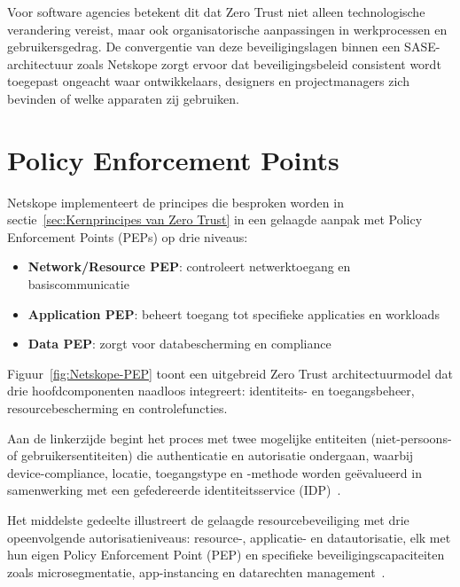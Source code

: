 \vspace{2ex}

Voor software agencies betekent dit dat Zero Trust niet alleen technologische verandering vereist, maar ook organisatorische aanpassingen in werkprocessen en gebruikersgedrag. De convergentie van deze beveiligingslagen binnen een SASE-architectuur zoals Netskope zorgt ervoor dat beveiligingsbeleid consistent wordt toegepast ongeacht waar ontwikkelaars, designers en projectmanagers zich bevinden of welke apparaten zij gebruiken.

\section{Policy Enforcement Points}
Netskope implementeert de principes die besproken worden in sectie~\ref{sec:Kernprincipes van Zero Trust} in een gelaagde aanpak met Policy Enforcement Points (PEPs) op drie niveaus:

\begin{itemize}
  \item \textbf{Network/Resource PEP}: controleert netwerktoegang en basiscommunicatie
  \item \textbf{Application PEP}: beheert toegang tot specifieke applicaties en workloads
  \item \textbf{Data PEP}: zorgt voor databescherming en compliance
\end{itemize}

Figuur~\ref{fig:Netskope-PEP} toont een uitgebreid Zero Trust architectuurmodel dat drie hoofdcomponenten naadloos integreert: identiteits- en toegangsbeheer, resourcebescherming en controlefuncties. 

\vspace{2ex}

Aan de linkerzijde begint het proces met twee mogelijke entiteiten (niet-persoons- of gebruikersentiteiten) die authenticatie en autorisatie ondergaan, waarbij device-compliance, locatie, toegangstype en -methode worden geëvalueerd in samenwerking met een gefedereerde identiteitsservice (IDP)~\autocite{Netskope2024}. 

\vspace{2ex}

Het middelste gedeelte illustreert de gelaagde resourcebeveiliging met drie opeenvolgende autorisatieniveaus: resource-, applicatie- en datautorisatie, elk met hun eigen Policy Enforcement Point (PEP) en specifieke beveiligingscapaciteiten zoals microsegmentatie, app-instancing en datarechten management~\autocite{Netskope2024}. 

